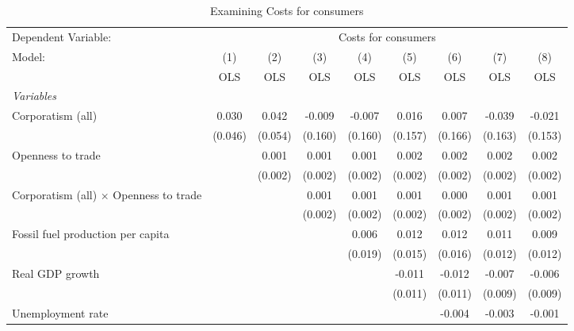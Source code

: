 
\begin{table}[htbp]
   \caption{Examining Costs for consumers}
   \centering
   \begin{tabular}{lcccccccc}
      \toprule
      Dependent Variable: & \multicolumn{8}{c}{Costs for consumers}\\
      Model:                                        & (1)     & (2)     & (3)     & (4)     & (5)     & (6)     & (7)     & (8)\\  
                                                    &  OLS    & OLS     & OLS     & OLS     & OLS     & OLS     & OLS     & OLS\\  
      \midrule
      \emph{Variables}\\
      Corporatism (all)                             & 0.030   & 0.042   & -0.009  & -0.007  & 0.016   & 0.007   & -0.039  & -0.021\\   
                                                    & (0.046) & (0.054) & (0.160) & (0.160) & (0.157) & (0.166) & (0.163) & (0.153)\\   
      Openness to trade                             &         & 0.001   & 0.001   & 0.001   & 0.002   & 0.002   & 0.002   & 0.002\\   
                                                    &         & (0.002) & (0.002) & (0.002) & (0.002) & (0.002) & (0.002) & (0.002)\\   
      Corporatism (all) $\times$ Openness to trade  &         &         & 0.001   & 0.001   & 0.001   & 0.000   & 0.001   & 0.001\\   
                                                    &         &         & (0.002) & (0.002) & (0.002) & (0.002) & (0.002) & (0.002)\\   
      Fossil fuel production per capita             &         &         &         & 0.006   & 0.012   & 0.012   & 0.011   & 0.009\\   
                                                    &         &         &         & (0.019) & (0.015) & (0.016) & (0.012) & (0.012)\\   
      Real GDP growth                               &         &         &         &         & -0.011  & -0.012  & -0.007  & -0.006\\   
                                                    &         &         &         &         & (0.011) & (0.011) & (0.009) & (0.009)\\   
      Unemployment rate                             &         &         &         &         &         & -0.004  & -0.003  & -0.001\\   

\end{tabular}
\end{table}
